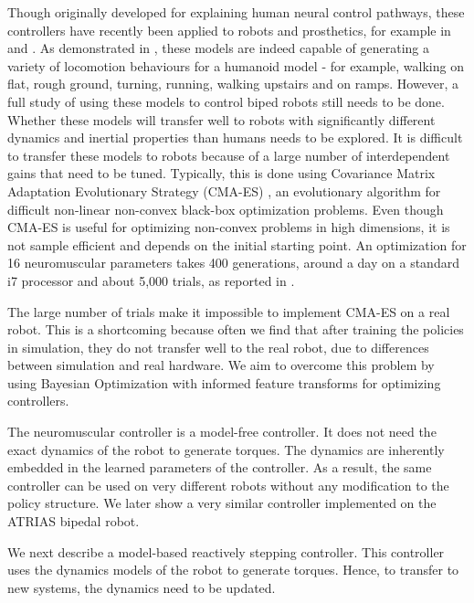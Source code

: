 Though originally developed for explaining human neural control pathways, these controllers have recently been applied to robots and prosthetics, for example in \cite{thatte} and \cite{van2015biped}. As demonstrated in \cite{song2015neural}, these models are indeed capable of generating a variety of locomotion behaviours for a humanoid model - for example, walking on flat, rough ground, turning, running, walking upstairs and on ramps. However, a full study of using these models to control biped robots still needs to be done. Whether these models will transfer well to robots with significantly different dynamics and inertial properties than humans needs to be explored. It is difficult to transfer these models to robots because of a large number of interdependent gains that need to be tuned. Typically, this is done using Covariance Matrix Adaptation Evolutionary Strategy \mbox{(CMA-ES)} \citep{hansen2006cma}, an evolutionary algorithm for difficult non-linear non-convex black-box optimization problems. Even though CMA-ES is useful for optimizing non-convex problems in high dimensions, it is not sample efficient and depends on the initial starting point. An optimization for 16 neuromuscular parameters takes 400 generations, around a day on a standard i7 processor and about 5,000 trials, as reported in \cite{song2015neural}. 

The large number of trials make it impossible to implement CMA-ES on a real robot. This is a shortcoming because often we find that after training the policies in simulation, they do not transfer well to the real robot, due to differences between simulation and real hardware. We aim to overcome this problem by using Bayesian Optimization with informed feature transforms for optimizing controllers.

The neuromuscular controller is a model-free controller. It does not need the exact dynamics of the robot to generate torques. The dynamics are inherently embedded in the learned parameters of the controller. As a result, the same controller can be used on very different robots without any modification to the policy structure. We later show a very similar controller implemented on the ATRIAS bipedal robot.

We next describe a model-based reactively stepping controller. This controller uses the dynamics models of the robot to generate torques. Hence, to transfer to new systems, the dynamics need to be updated.


